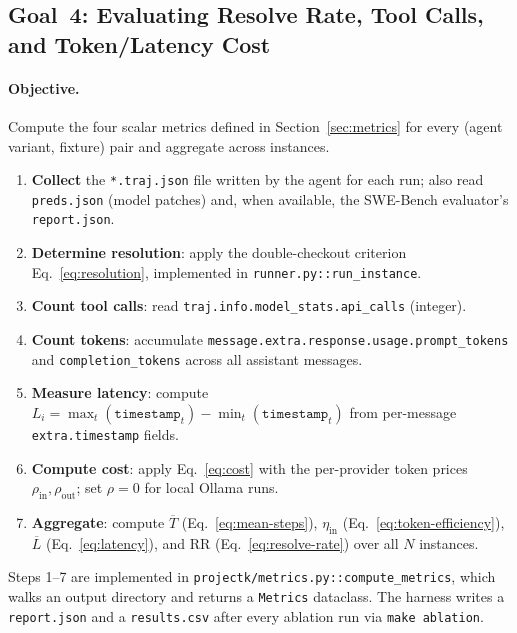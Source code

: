 \documentclass[11pt]{article}
\begin{document}
\subsection{Goal~4: Evaluating Resolve Rate, Tool Calls, and Token/Latency Cost}
\label{sec:goal-eval}

\paragraph{Objective.}
Compute the four scalar metrics defined in Section~\ref{sec:metrics} for
every (agent variant, fixture) pair and aggregate across instances.

\begin{enumerate}[leftmargin=*,label=\textbf{Step~\arabic*.}]
  \item \textbf{Collect} the \texttt{*.traj.json} file written by the agent
        for each run; also read \texttt{preds.json} (model patches) and,
        when available, the SWE-Bench evaluator's \texttt{report.json}.
  \item \textbf{Determine resolution}: apply the double-checkout criterion
        Eq.~\eqref{eq:resolution}, implemented in
        \texttt{runner.py::run\_instance}.
  \item \textbf{Count tool calls}: read
        \texttt{traj.info.model\_stats.api\_calls} (integer).
  \item \textbf{Count tokens}: accumulate
        \texttt{message.extra.response.usage.prompt\_tokens} and
        \texttt{completion\_tokens} across all assistant messages.
  \item \textbf{Measure latency}: compute
        $L_i = \max_t(\texttt{timestamp}_t) -
               \min_t(\texttt{timestamp}_t)$
        from per-message \texttt{extra.timestamp} fields.
  \item \textbf{Compute cost}: apply Eq.~\eqref{eq:cost} with the
        per-provider token prices $\rho_{\text{in}},\rho_{\text{out}}$;
        set $\rho = 0$ for local Ollama runs.
  \item \textbf{Aggregate}: compute
        $\overline{T}$ (Eq.~\eqref{eq:mean-steps}),
        $\eta_{\text{in}}$ (Eq.~\eqref{eq:token-efficiency}),
        $\overline{L}$ (Eq.~\eqref{eq:latency}), and
        $\text{RR}$ (Eq.~\eqref{eq:resolve-rate}) over all $N$ instances.
\end{enumerate}

Steps 1--7 are implemented in
\texttt{projectk/metrics.py::compute\_metrics}, which walks an output
directory and returns a \texttt{Metrics} dataclass.  The harness writes a
\texttt{report.json} and a \texttt{results.csv} after every ablation run
via \texttt{make ablation}.
\end{document}
